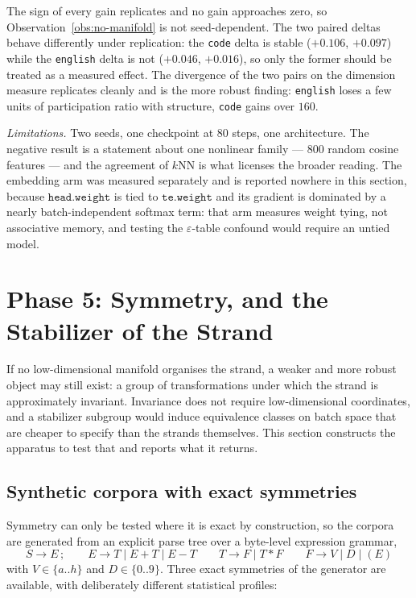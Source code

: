 The sign of every gain replicates and no gain approaches zero, so
Observation~\ref{obs:no-manifold} is not seed-dependent. The two paired deltas
behave differently under replication: the \texttt{code} delta is stable
($+0.106$, $+0.097$) while the \texttt{english} delta is not ($+0.046$,
$+0.016$), so only the former should be treated as a measured effect. The
divergence of the two pairs on the dimension measure replicates cleanly and is
the more robust finding: \texttt{english} loses a few units of participation
ratio with structure, \texttt{code} gains over $160$.

\emph{Limitations.} Two seeds, one checkpoint at $80$ steps, one architecture. The negative result is a statement
about one nonlinear family --- $800$ random cosine features --- and the
agreement of $k$NN is what licenses the broader reading. The embedding arm was
measured separately and is reported nowhere in this section, because
$\texttt{head.weight}$ is tied to $\texttt{te.weight}$ and its gradient is
dominated by a nearly batch-independent softmax term: that arm measures weight
tying, not associative memory, and testing the $\varepsilon$-table confound
would require an untied model.

\section{Phase 5: Symmetry, and the Stabilizer of the Strand}
\label{sec:symmetry}

If no low-dimensional manifold organises the strand, a weaker and more robust
object may still exist: a group of transformations under which the strand is
approximately invariant. Invariance does not require low-dimensional
coordinates, and a stabilizer subgroup would induce equivalence classes on
batch space that are cheaper to specify than the strands themselves. This
section constructs the apparatus to test that and reports what it returns.

\subsection{Synthetic corpora with exact symmetries}
\label{sec:synth}

Symmetry can only be tested where it is exact by construction, so the corpora
are generated from an explicit parse tree over a byte-level expression
grammar,
\[
S\to E\,;\qquad E\to T \mid E{+}T \mid E{-}T \qquad T\to F\mid T{*}F
\qquad F\to V\mid D\mid (E)
\]
with $V\in\{a..h\}$ and $D\in\{0..9\}$. Three exact symmetries of the
generator are available, with deliberately different statistical profiles:

